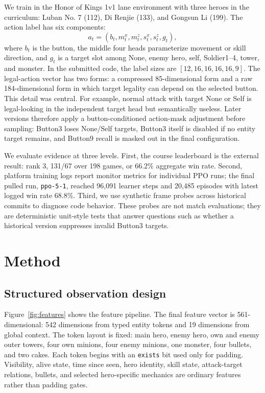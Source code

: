 \documentclass{article}
\begin{document}
We train in the Honor of Kings 1v1 lane environment with three heroes in the curriculum: Luban No. 7 (112), Di Renjie (133), and Gongsun Li (199). The action label has six components:
\[
  a_t = (b_t, m^x_t, m^z_t, s^x_t, s^z_t, g_t),
\]
where $b_t$ is the button, the middle four heads parameterize movement or skill direction, and $g_t$ is a target slot among None, enemy hero, self, Soldier1--4, tower, and monster. In the submitted code, the label sizes are $[12,16,16,16,16,9]$. The legal-action vector has two forms: a compressed 85-dimensional form and a raw 184-dimensional form in which target legality can depend on the selected button. This detail was central. For example, normal attack with target None or Self is legal-looking in the independent target head but semantically useless. Later versions therefore apply a button-conditioned action-mask adjustment before sampling: Button3 loses None/Self targets, Button3 itself is disabled if no entity target remains, and Button9 recall is masked out in the final configuration.

We evaluate evidence at three levels. First, the course leaderboard is the external result: rank 3, 131/67 over 198 games, or 66.2\% aggregate win rate. Second, platform training logs report monitor metrics for individual PPO runs; the final pulled run, \texttt{ppo-5-1}, reached 96,091 learner steps and 20,485 episodes with latest logged win rate 68.8\%. Third, we use synthetic frame probes across historical commits to diagnose code behavior. These probes are not match evaluations; they are deterministic unit-style tests that answer questions such as whether a historical version suppresses invalid Button3 targets.

\section{Method}

\subsection{Structured observation design}

Figure~\ref{fig:features} shows the feature pipeline. The final feature vector is 561-dimensional: 542 dimensions from typed entity tokens and 19 dimensions from global context. The token layout is fixed:
main hero, enemy hero, own and enemy outer towers, four own minions, four enemy minions, one monster, four bullets, and two cakes. Each token begins with an \texttt{exists} bit used only for padding. Visibility, alive state, time since seen, hero identity, skill state, attack-target relations, bullets, and selected hero-specific mechanics are ordinary features rather than padding gates.
\end{document}
